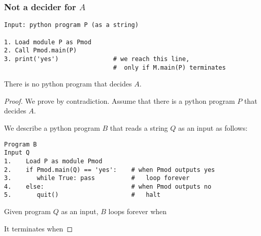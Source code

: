 


\begin{frame}[fragile=true]
  \frametitle{Not a decider for $A$}
  
\begin{verbatim}
Input: python program P (as a string)

1. Load module P as Pmod
2. Call Pmod.main(P)
3. print('yes')               # we reach this line,
                              #  only if M.main(P) terminates
\end{verbatim}
\end{frame}

\begin{frame}[fragile=true]

  \begin{lemma}
    There is no python program that decides $A$.
  \end{lemma}
  \begin{proof}
    We prove by contradiction. Assume that there is a python program
    $P$ that decides $A$.  \pause

    We describe a python program $B$ that reads a string $Q$ as an
    input as follows:

    {\small
\begin{verbatim}
Program B
Input Q
1.    Load P as module Pmod
2.    if Pmod.main(Q) == 'yes':    # when Pmod outputs yes
3.       while True: pass          #   loop forever 
4.    else:                        # when Pmod outputs no
5.       quit()                    #   halt
\end{verbatim}
    }

    Given program $Q$ as an input, $B$ loops forever when \pause

    It terminates when
  \end{proof}
\end{frame}

